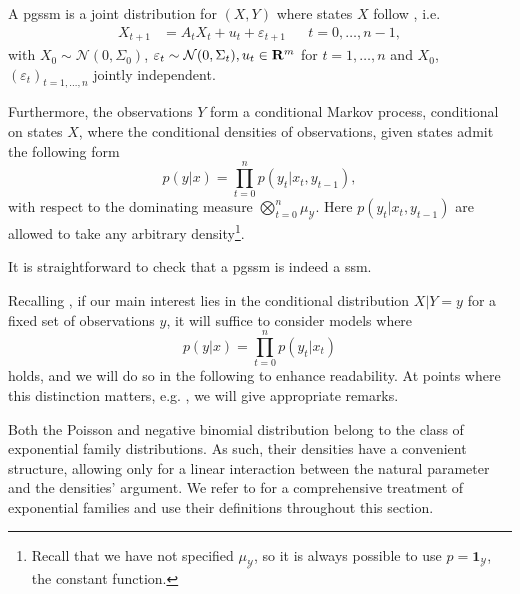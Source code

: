\begin{definition}
    A \acrfull{pgssm} is a joint distribution for $(X,Y)$ where states $X$ follow , i.e. 
    \begin{align*}
        X_{t + 1}  &= A_{t}X_{t} + u_{t} + \varepsilon_{t + 1} &  & t = 0, \dots, n - 1,
    \end{align*}
    with $X_{0} \sim \mathcal N(0, \Sigma_{0})$, $\varepsilon_{t} \sim \mathcal N (0, \Sigma_{t}), u_{t} \in \mathbf R^{m}$ for $t = 1, \dots, n$ and $X_{0}$, $(\varepsilon_{t})_{t = 1, \dots, n}$ jointly independent. 

    Furthermore, the observations $Y$ form a conditional Markov process, conditional on states $X$, where the conditional densities of observations, given states admit the following form
    $$
    p(y | x) = \prod_{t = 0}^n p(y_{t} | x_{t}, y_{t - 1}),
    $$
    with respect to the dominating measure $\bigotimes_{t = 0}^n\mu_{\mathcal Y}$.
    Here $p(y_{t} | x_{t}, y_{t -1})$ are allowed to take any arbitrary density\footnote{Recall that we have not specified $\mu_{\mathcal Y}$, so it is always possible to use $p = \mathbf 1 _{\mathcal Y}$, the constant function.}.
\end{definition}

It is straightforward to check that a \acrshort{pgssm} is indeed a \acrshort{ssm}. 

\begin{remark}
    Recalling , if our main interest lies in the conditional distribution $X|Y = y$ for a fixed set of observations $y$, it will suffice to consider models where 
    $$
    p(y | x) = \prod_{t = 0}^n p(y_{t} | x_{t})
    $$
    holds, and we will do so in the following to enhance readability. At points where this distinction matters, e.g. , we will give appropriate remarks.
\end{remark}

Both the Poisson and negative binomial distribution belong to the class of exponential family distributions. As such, their densities have a convenient structure, allowing only for a linear interaction between the natural parameter and the densities' argument. We refer to \citep{Brown1986Fundamentals} for a comprehensive treatment of exponential families and use their definitions throughout this section.

